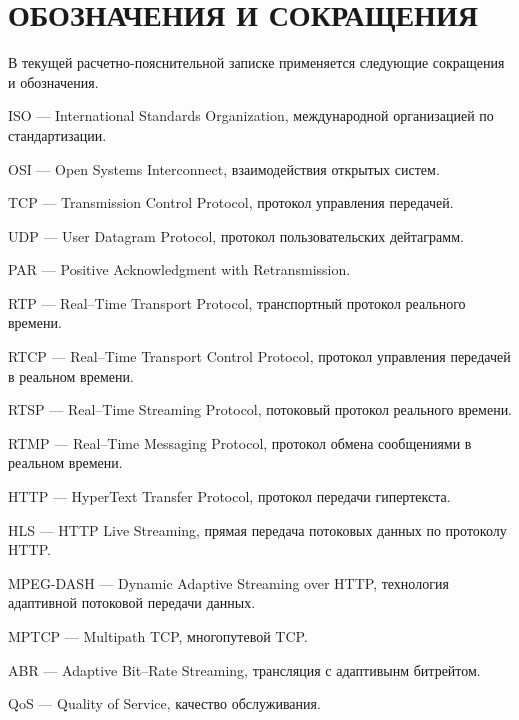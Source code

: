 \chapter*{ОБОЗНАЧЕНИЯ И СОКРАЩЕНИЯ}

В текущей расчетно-пояснительной записке применяется следующие сокращения и обозначения.

\begin{description}[leftmargin=0pt]
	\item \noindent ISO --- International Standards Organization, международной организацией по стандартизации.
	\item \noindent OSI --- Open Systems Interconnect, взаимодействия открытых систем.
	\item \noindent TCP --- Transmission Control Protocol,  протокол управления передачей.
	\item \noindent UDP --- User Datagram Protocol, протокол пользовательских дейтаграмм.
	\item \noindent PAR --- Positive Acknowledgment with Retransmission.
	\item \noindent RTP --- Real--Time Transport Protocol, транспортный протокол реального времени.
	\item \noindent RTCP --- Real--Time Transport Control Protocol, протокол управления передачей в реальном времени.
	\item \noindent RTSP --- Real--Time Streaming Protocol, потоковый протокол реального времени.
	\item \noindent RTMP --- Real--Time Messaging Protocol, протокол обмена сообщениями в реальном времени.
	\item \noindent HTTP --- HyperText Transfer Protocol, протокол передачи гипертекста.
	\item \noindent HLS --- HTTP Live Streaming, прямая передача потоковых данных по протоколу HTTP.
	\item \noindent MPEG-DASH --- Dynamic Adaptive Streaming over HTTP, технология адаптивной потоковой передачи данных.
	\item \noindent MPTCP --- Multipath TCP, многопутевой TCP. 
	\item \noindent ABR --- Adaptive Bit--Rate Streaming, трансляция с адаптивынм битрейтом.
	\item \noindent QoS --- Quality of Service, качество обслуживания.
\end{description}

